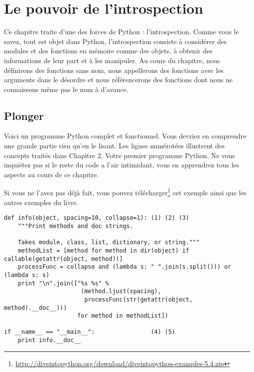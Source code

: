 \chapter{Le pouvoir de l’introspection}

Ce chapitre traite d’une des forces de Python : l’introspection. Comme vous le savez, tout est objet dans Python, l’introspection consiste à considérer des modules  et des fonctions en mémoire comme des objets, à obtenir des informations de leur part et à les manipuler. Au cours du chapitre, nous définirons des fonctions sans nom, nous appellerons des fonctions avec les arguments dans le désordre et nous référencerons des fonctions dont nous ne connaissons même pas le nom à d’avance.

\section{Plonger}

Voici un programme Python complet et fonctionnel. Vous devriez en comprendre une grande partie rien qu’en le lisant. Les lignes numérotées illustrent des concepts traités dans Chapitre 2, Votre premier programme Python. Ne vous inquiétez pas si le reste du code a l’air intimidant, vous en apprendrez tous les aspects au cours de ce chapitre.

\begin{example}[apihelper.py]
Si vous ne l’avez pas déjà fait, vous pouvez télécharger\footnote{\url{ http://diveintopython.org/download/diveintopython-examples-5.4.zip}} cet exemple ainsi que les autres exemples du livre.

\begin{lstlisting}
def info(object, spacing=10, collapse=1): (1) (2) (3)
    """Print methods and doc strings.

    Takes module, class, list, dictionary, or string."""
    methodList = [method for method in dir(object) if callable(getattr(object, method))]
    processFunc = collapse and (lambda s: " ".join(s.split())) or (lambda s: s)
    print "\n".join(["%s %s" %
                      (method.ljust(spacing),
                       processFunc(str(getattr(object, method).__doc__)))
                     for method in methodList])

if __name__ == "__main__":                (4) (5)
    print info.__doc__
\end{lstlisting}
\end{example}

